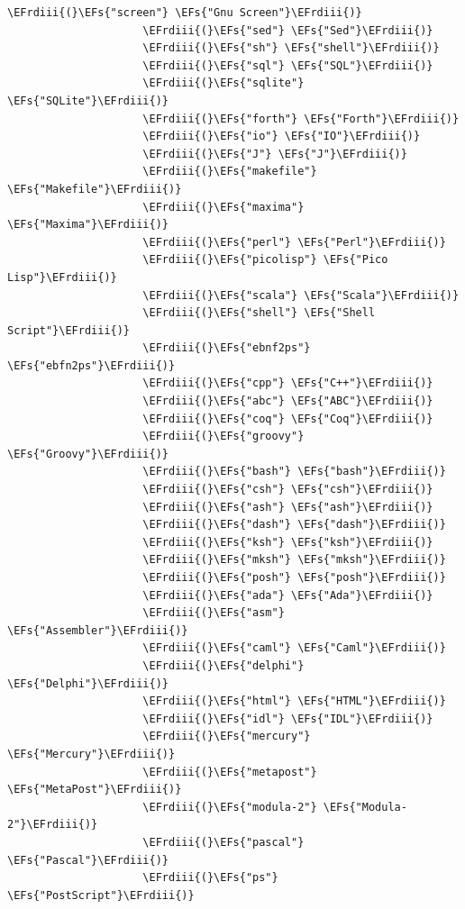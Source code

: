 \documentclass{scrartcl}
\newcommand{\EFs}[1]{\textcolor{EFs}{#1}} %
\newcommand{\EFrdiii}[1]{\textcolor{EFrdiii}{#1}} %
\begin{document}
\begin{Code}
\begin{Verbatim}[]
                     \EFrdiii{(}\EFs{"screen"} \EFs{"Gnu Screen"}\EFrdiii{)}
                     \EFrdiii{(}\EFs{"sed"} \EFs{"Sed"}\EFrdiii{)}
                     \EFrdiii{(}\EFs{"sh"} \EFs{"shell"}\EFrdiii{)}
                     \EFrdiii{(}\EFs{"sql"} \EFs{"SQL"}\EFrdiii{)}
                     \EFrdiii{(}\EFs{"sqlite"} \EFs{"SQLite"}\EFrdiii{)}
                     \EFrdiii{(}\EFs{"forth"} \EFs{"Forth"}\EFrdiii{)}
                     \EFrdiii{(}\EFs{"io"} \EFs{"IO"}\EFrdiii{)}
                     \EFrdiii{(}\EFs{"J"} \EFs{"J"}\EFrdiii{)}
                     \EFrdiii{(}\EFs{"makefile"} \EFs{"Makefile"}\EFrdiii{)}
                     \EFrdiii{(}\EFs{"maxima"} \EFs{"Maxima"}\EFrdiii{)}
                     \EFrdiii{(}\EFs{"perl"} \EFs{"Perl"}\EFrdiii{)}
                     \EFrdiii{(}\EFs{"picolisp"} \EFs{"Pico Lisp"}\EFrdiii{)}
                     \EFrdiii{(}\EFs{"scala"} \EFs{"Scala"}\EFrdiii{)}
                     \EFrdiii{(}\EFs{"shell"} \EFs{"Shell Script"}\EFrdiii{)}
                     \EFrdiii{(}\EFs{"ebnf2ps"} \EFs{"ebfn2ps"}\EFrdiii{)}
                     \EFrdiii{(}\EFs{"cpp"} \EFs{"C++"}\EFrdiii{)}
                     \EFrdiii{(}\EFs{"abc"} \EFs{"ABC"}\EFrdiii{)}
                     \EFrdiii{(}\EFs{"coq"} \EFs{"Coq"}\EFrdiii{)}
                     \EFrdiii{(}\EFs{"groovy"} \EFs{"Groovy"}\EFrdiii{)}
                     \EFrdiii{(}\EFs{"bash"} \EFs{"bash"}\EFrdiii{)}
                     \EFrdiii{(}\EFs{"csh"} \EFs{"csh"}\EFrdiii{)}
                     \EFrdiii{(}\EFs{"ash"} \EFs{"ash"}\EFrdiii{)}
                     \EFrdiii{(}\EFs{"dash"} \EFs{"dash"}\EFrdiii{)}
                     \EFrdiii{(}\EFs{"ksh"} \EFs{"ksh"}\EFrdiii{)}
                     \EFrdiii{(}\EFs{"mksh"} \EFs{"mksh"}\EFrdiii{)}
                     \EFrdiii{(}\EFs{"posh"} \EFs{"posh"}\EFrdiii{)}
                     \EFrdiii{(}\EFs{"ada"} \EFs{"Ada"}\EFrdiii{)}
                     \EFrdiii{(}\EFs{"asm"} \EFs{"Assembler"}\EFrdiii{)}
                     \EFrdiii{(}\EFs{"caml"} \EFs{"Caml"}\EFrdiii{)}
                     \EFrdiii{(}\EFs{"delphi"} \EFs{"Delphi"}\EFrdiii{)}
                     \EFrdiii{(}\EFs{"html"} \EFs{"HTML"}\EFrdiii{)}
                     \EFrdiii{(}\EFs{"idl"} \EFs{"IDL"}\EFrdiii{)}
                     \EFrdiii{(}\EFs{"mercury"} \EFs{"Mercury"}\EFrdiii{)}
                     \EFrdiii{(}\EFs{"metapost"} \EFs{"MetaPost"}\EFrdiii{)}
                     \EFrdiii{(}\EFs{"modula-2"} \EFs{"Modula-2"}\EFrdiii{)}
                     \EFrdiii{(}\EFs{"pascal"} \EFs{"Pascal"}\EFrdiii{)}
                     \EFrdiii{(}\EFs{"ps"} \EFs{"PostScript"}\EFrdiii{)}

\end{Verbatim}
\end{Code}
\end{document}
